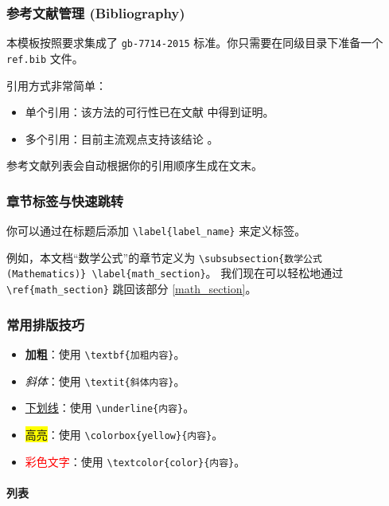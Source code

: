 \documentclass[a4paper,zihao=-4,AutoFakeBold,AutoFakeSlant]{ctexart}
\begin{document}
\subsubsection{参考文献管理 (Bibliography)}

本模板按照要求集成了 \texttt{gb-7714-2015} 标准。你只需要在同级目录下准备一个 \texttt{ref.bib} 文件。

引用方式非常简单：

\begin{itemize}
    \item 单个引用：该方法的可行性已在文献 \cite{MAGNET_CAR} 中得到证明。
    \item 多个引用：目前主流观点支持该结论 \cite{MAGNET_CAR,WATER_WHEEL}。
\end{itemize}

参考文献列表会自动根据你的引用顺序生成在文末。

\subsubsection{章节标签与快速跳转}

你可以通过在标题后添加 \texttt{\textbackslash label\{label\_name\}} 来定义标签。

例如，本文档“数学公式”的章节定义为 
\texttt{\textbackslash subsubsection\{数学公式 (Mathematics)\} \textbackslash label\{math\_section\}}。
我们现在可以轻松地通过 \texttt{\textbackslash ref\{math\_section\}} 
跳回该部分 \ref{math_section}。

\subsubsection{常用排版技巧}

\begin{itemize}
    \item \textbf{加粗}：使用 \texttt{\textbackslash textbf\{加粗内容\}}。
    \item \textit{斜体}：使用 \texttt{\textbackslash textit\{斜体内容\}}。
    \item \underline{下划线}：使用 \texttt{\textbackslash underline\{内容\}}。
    \item \colorbox{yellow}{高亮}：使用 \texttt{\textbackslash colorbox\{yellow\}\{内容\}}。
    \item \textcolor{red}{彩色文字}：使用 \texttt{\textbackslash textcolor\{color\}\{内容\}}。
\end{itemize}

\paragraph{列表}
\end{document}
